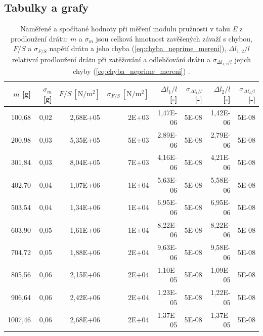\documentclass[english]{article}
\newcommand{\unit}[1]{\mathrm{#1}}
\begin{document}
\subsection{Tabulky a grafy}
\begin{table}[htbp]
  \centering
    \begin{tabular}{|r|r|r|r|r|r|r|r|}
    \hline
    $m$ [g] & $\sigma_m$ [g] & $F/S\unit{\ [N/m^2]}$ & $\sigma_{F/S}\unit{\ [N/m^2]}$ & $\Delta l_1/l$ [-] & $\sigma_{\Delta l_1/l}$ [-] & $\Delta l_2/l$ [-] & $\sigma_{\Delta l_2/l}$ [-] \bigstrut\\
    \hline
    100,68 & 0,02  & 2,68E+05 & 2E+03 & 1,47E-06 & 5E-08 & 1,42E-06 & 5E-08 \bigstrut\\
    \hline
    200,98 & 0,03  & 5,35E+05 & 5E+03 & 2,89E-06 & 5E-08 & 2,79E-06 & 5E-08 \bigstrut\\
    \hline
    301,84 & 0,03  & 8,04E+05 & 7E+03 & 4,16E-06 & 5E-08 & 4,21E-06 & 5E-08 \bigstrut\\
    \hline
    402,70 & 0,04  & 1,07E+06 & 1E+04 & 5,63E-06 & 5E-08 & 5,58E-06 & 5E-08 \bigstrut\\
    \hline
    503,54 & 0,04  & 1,34E+06 & 1E+04 & 6,95E-06 & 5E-08 & 6,95E-06 & 5E-08 \bigstrut\\
    \hline
    603,90 & 0,05  & 1,61E+06 & 1E+04 & 8,22E-06 & 5E-08 & 8,22E-06 & 5E-08 \bigstrut\\
    \hline
    704,72 & 0,05  & 1,88E+06 & 2E+04 & 9,63E-06 & 5E-08 & 9,58E-06 & 5E-08 \bigstrut\\
    \hline
    805,56 & 0,06  & 2,15E+06 & 2E+04 & 1,10E-05 & 5E-08 & 1,09E-05 & 5E-08 \bigstrut\\
    \hline
    906,64 & 0,06  & 2,42E+06 & 2E+04 & 1,23E-05 & 5E-08 & 1,22E-05 & 5E-08 \bigstrut\\
    \hline
    1007,46 & 0,06  & 2,68E+06 & 2E+04 & 1,37E-05 & 5E-08 & 1,37E-05 & 5E-08 \bigstrut\\
    \hline
    \end{tabular}%
 \caption{Naměřené a spočítané hodnoty při měření modulu pružnosti v tahu \emph{E} z prodloužení drátu: $m$ a $\sigma_m$ jsou celková hmotnost zavěšených závaží s chybou, $F/S$ a $\sigma_{F/S}$ napětí drátu a jeho chyba (\ref{eq:chyba_neprime_mereni}), $\Delta l_{1,2}/l$ relativní prodloužení drátu při zatěžování a odlehčování drátu a $\sigma_{\Delta l_{1,2}/l}$ jejich chyby (\ref{eq:chyba_neprime_mereni}) . }
 \label{tab:E1}%
\end{table}%
\end{document}
